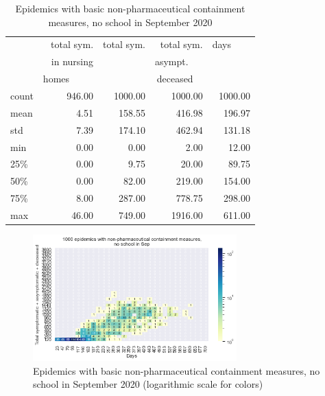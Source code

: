 \documentclass[11pt]{article}
\begin{document}
\begin{table}[H]
\center
\small
\begin{tabular}{lrrrr}
\toprule
{} & total sym.        &  total sym. & total sym.     & days~~~~ \\
{} & in nursing        &                  & asympt.~~~  & \\
{} & homes~~~~~  &                  & deceased~~ & \\
\midrule
count &     946.00 &             1000.00 &                 1000.00 & 1000.00 \\
mean  &       4.51 &              158.55 &                  416.98 &  196.97 \\
std   &       7.39 &              174.10 &                  462.94 &  131.18 \\
min   &       0.00 &                0.00 &                    2.00 &   12.00 \\
25\%   &       0.00 &                9.75 &                   20.00 &   89.75 \\
50\%   &       0.00 &               82.00 &                  219.00 &  154.00 \\
75\%   &       8.00 &              287.00 &                  778.75 &  298.00 \\
max   &      46.00 &              749.00 &                 1916.00 &  611.00 \\
\bottomrule
\end{tabular}

\label{EpidemicsWithAndNoSchoolT}
\caption{Epidemics with basic non-pharmaceutical containment measures, no school in September 2020}
\end{table}


\begin{figure}[H]
\begin{center}
\includegraphics[width=0.7\textwidth]{HM30_readRunResults1k_withControl_plusHMlog.png}
\caption{Epidemics with basic non-pharmaceutical containment measures, no school in September 2020 (logarithmic scale for colors)}
\label{EpidemicsWithAndNoSchoolHM}
\end{center}
\end{figure}
\end{document}
